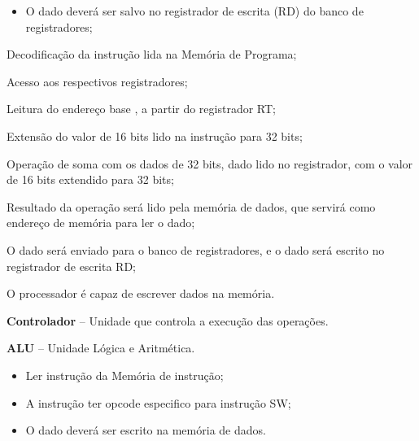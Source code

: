 \documentclass{article}
\begin{document}
  \postconditions
    \begin{itemize}
     \item O dado deverá ser salvo no registrador de escrita (RD) do banco de registradores;
    \end{itemize}
  
  
  \begin{mainflow}
    \item Decodificação da instrução lida na Memória de Programa;
    \item Acesso aos respectivos registradores;
	\item Leitura do endereço base , a partir do registrador RT;
	\item Extensão do valor de 16 bits lido na instrução para 32 bits;
	\item Operação de soma com os dados de 32 bits, dado lido no registrador, com o valor de 16 bits extendido para 32 bits;
	\item Resultado da operação será lido pela memória de dados, que servirá como endereço de memória para ler o dado;
	\item O dado será enviado para o banco de registradores, e o dado será escrito no registrador de escrita RD;

  \end{mainflow}
  
  O processador é capaz de escrever dados na memória.
  \actors
    \begin{description}
     \item \textbf{Controlador} – Unidade que controla a execução das operações.
     \item \textbf{ALU} – Unidade L\'{o}gica e Aritm\'{e}tica.
    \end{description}
    
  \preconditions 
    \begin{itemize}
     \item Ler instrução da Memória de instrução;
	 \item A instrução ter opcode especifico para instrução SW;
    \end{itemize}

  \postconditions
    \begin{itemize}
     \item O dado deverá ser escrito na memória de dados.
    \end{itemize}
  
\end{document}
